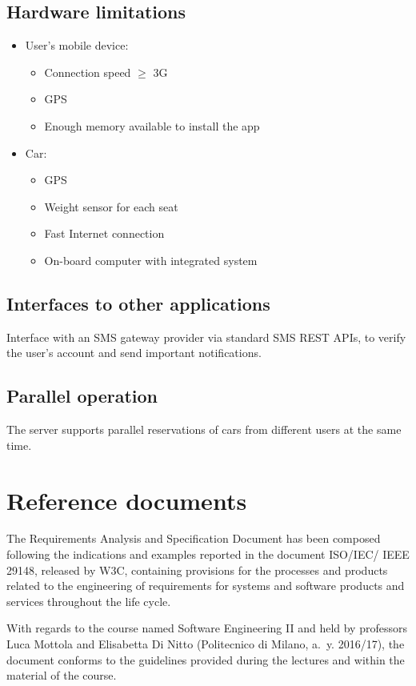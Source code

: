 \subsection{Hardware limitations}
\begin{itemize}
	\item User's mobile device:
\begin{itemize}
	\item Connection speed \(\geqslant\) 3G
	\item GPS
	\item Enough memory available to install the app
\end{itemize}
	\item Car:
	\begin{itemize}
	\item GPS
	\item Weight sensor for each seat
	\item Fast Internet connection
	\item On-board computer with integrated system
\end{itemize}
\end{itemize}

\subsection{Interfaces to other applications}
Interface with an SMS gateway provider via standard SMS REST APIs, to verify the user's account and send important notifications.

\subsection{Parallel operation}
The server supports parallel reservations of cars from different users at the same time.

\section{Reference documents}
The Requirements Analysis and Specification Document has been composed following the indications and examples reported in the document ISO/IEC/ IEEE 29148, released by W3C, containing provisions for the processes and products related to the engineering of requirements for systems and software products and services throughout the life cycle.

With regards to the course named Software Engineering II and held by professors Luca Mottola and Elisabetta Di Nitto (Politecnico di Milano, a.~y. 2016/17), the document conforms to the guidelines provided during the lectures and within the material of the course.
